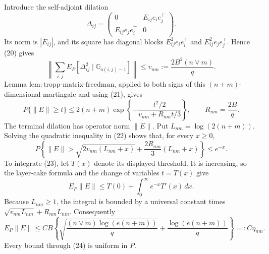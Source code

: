 Introduce the self-adjoint dilation
\[
 \Delta_{ij}=
 \begin{pmatrix}
 0&E_{ij}e_ie_j^\top\\
 E_{ij}e_je_i^\top&0
 \end{pmatrix}.
\]
Its norm is \(|E_{ij}|\), and its square has diagonal blocks \(E_{ij}^2e_ie_i^\top\) and \(E_{ij}^2e_je_j^\top\).  Hence (20) gives
\[
 \left\lVert\sum_{i,j}E_P[\Delta_{ij}^2
 \mid\mathbb G_{o(i,j)-1}]\right\rVert
 \le v_{nm}:=\frac{2B^2(n\vee m)}q.
\]
Lemma \(\mathrm{lem:tropp\mbox{-}matrix\mbox{-}freedman}\), applied to both signs of this \((n+m)\)-dimensional martingale and using (21), gives
\[
 P\{\lVert E\rVert\ge t\}
 \le2(n+m)\exp\!\left\{-\frac{t^2/2}{v_{nm}+R_{nm}t/3}\right\},
 \qquad R_{nm}=\frac{2B}{q}.
 \tag{22}
\]
The terminal dilation has operator norm \(\lVert E\rVert\).  Put \(L_{nm}=\log(2(n+m))\).  Solving the quadratic inequality in (22) shows that, for every \(x\ge0\),
\[
 P\!\left\{\lVert E\rVert>
 \sqrt{2v_{nm}(L_{nm}+x)}+
 \frac{2R_{nm}}3(L_{nm}+x)\right\}\le e^{-x}.
 \tag{23}
\]
To integrate (23), let \(T(x)\) denote its displayed threshold.  It is increasing, so the layer-cake formula and the change of variables \(t=T(x)\) give
\[
 E_P\lVert E\rVert
 \le T(0)+\int_0^\infty e^{-x}T'(x)\,dx.
\]
Because \(L_{nm}\ge1\), the integral is bounded by a universal constant times \(\sqrt{v_{nm}L_{nm}}+R_{nm}L_{nm}\).  Consequently
\[
 E_P\lVert E\rVert
 \le C B\left\{
 \sqrt{\frac{(n\vee m)\log(e(n+m))}{q}}+
 \frac{\log(e(n+m))}{q}\right\}
 =:C\eta_{nm}.
 \tag{24}
\]
Every bound through (24) is uniform in \(P\).

